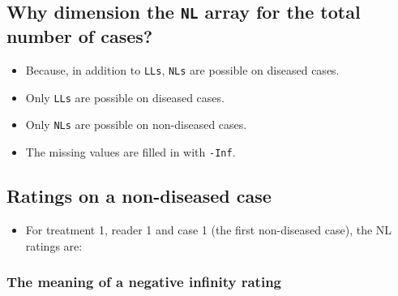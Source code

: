 \documentclass[]{book}
\newenvironment{Shaded}{\begin{snugshade}}{\end{snugshade}}
\newcommand{\CommentTok}[1]{\textcolor[rgb]{0.56,0.35,0.01}{\textit{#1}}}
\newcommand{\DecValTok}[1]{\textcolor[rgb]{0.00,0.00,0.81}{#1}}
\newcommand{\NormalTok}[1]{#1}
\newcommand{\OperatorTok}[1]{\textcolor[rgb]{0.81,0.36,0.00}{\textbf{#1}}}
\providecommand{\tightlist}{%
  \setlength{\itemsep}{0pt}\setlength{\parskip}{0pt}}
\begin{document}
\hypertarget{why-dimension-the-nl-array-for-the-total-number-of-cases-1}{%
\subsection{\texorpdfstring{Why dimension the \texttt{NL} array for the total number of cases?}{Why dimension the NL array for the total number of cases?}}\label{why-dimension-the-nl-array-for-the-total-number-of-cases-1}}

\begin{itemize}
\tightlist
\item
  Because, in addition to \texttt{LLs}, \texttt{NLs} are possible on diseased cases.
\item
  Only \texttt{LLs} are possible on diseased cases.
\item
  Only \texttt{NLs} are possible on non-diseased cases.
\item
  The missing values are filled in with \texttt{-Inf}.
\end{itemize}

\hypertarget{ratings-on-a-non-diseased-case-1}{%
\subsection{Ratings on a non-diseased case}\label{ratings-on-a-non-diseased-case-1}}

\begin{itemize}
\tightlist
\item
  For treatment 1, reader 1 and case 1 (the first non-diseased case), the NL ratings are:
\end{itemize}

\begin{Shaded}
\end{Shaded}

\hypertarget{the-meaning-of-a-negative-infinity-rating}{%
\subsubsection{The meaning of a negative infinity rating}\label{the-meaning-of-a-negative-infinity-rating}}
\end{document}

